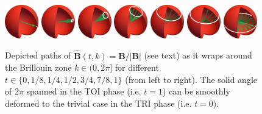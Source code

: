 \begin{figure}[ht]
    \centering
    \includegraphics[width=0.13\textwidth]{figures/ssh_deformed_normalized_bloch_vector_t0_000.jpg}
    \includegraphics[width=0.13\textwidth]{figures/ssh_deformed_normalized_bloch_vector_t0_125.jpg}
    \includegraphics[width=0.13\textwidth]{figures/ssh_deformed_normalized_bloch_vector_t0_250.jpg}
    \includegraphics[width=0.13\textwidth]{figures/ssh_deformed_normalized_bloch_vector_t0_500.jpg}
    \includegraphics[width=0.13\textwidth]{figures/ssh_deformed_normalized_bloch_vector_t0_750.jpg}
    \includegraphics[width=0.13\textwidth]{figures/ssh_deformed_normalized_bloch_vector_t0_825.jpg}
    \includegraphics[width=0.13\textwidth]{figures/ssh_deformed_normalized_bloch_vector_t1_000.jpg}
    \caption{Depicted paths of $\hat{\bm B}(t,k)={\bm B}/|{\bm B}|$ (see text) as it wraps around the Brillouin zone $k\in(0,2\pi]$ for different $t\in\{0,1/8,1/4,1/2,3/4,7/8,1\}$ (from left to right). The solid angle of $2\pi$ spanned in the TOI phase (i.e. $t=1$) can be smoothly deformed to the trivial case in the TRI phase (i.e. $t=0$).}
    \label{fig:ssh_deformed}
\end{figure}


